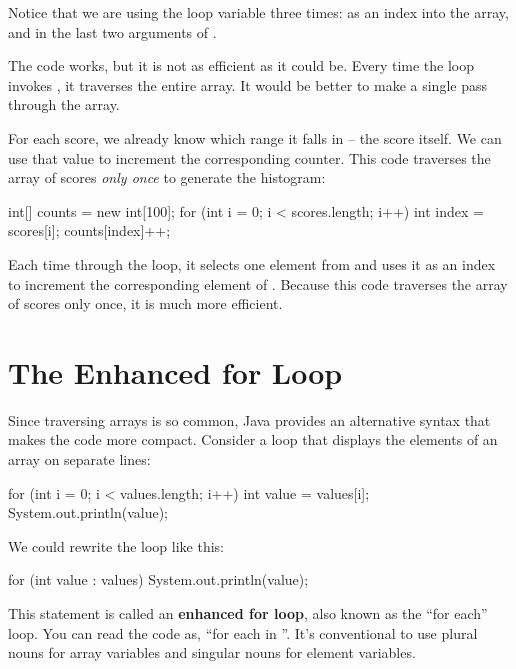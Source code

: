 Notice that we are using the loop variable  three times: as an index into the  array, and in the last two arguments of .


The code works, but it is not as efficient as it could be.
Every time the loop invokes , it traverses the entire array.
It would be better to make a single pass through the  array.

For each score, we already know which range it falls in -- the score itself.
We can use that value to increment the corresponding counter.
This code traverses the array of scores {\em only once} to generate the histogram:

\begin{code}
int[] counts = new int[100];
for (int i = 0; i < scores.length; i++) {
    int index = scores[i];
    counts[index]++;
}
\end{code}

Each time through the loop, it selects one element from  and uses it as an index to increment the corresponding element of .
Because this code traverses the array of scores only once, it is much more efficient.


\section{The Enhanced for Loop}
\label{enhanced}

Since traversing arrays is so common, Java provides an alternative syntax that makes the code more compact.
Consider a  loop that displays the elements of an array on separate lines:

\begin{code}
for (int i = 0; i < values.length; i++) {
    int value = values[i];
    System.out.println(value);
}
\end{code}

We could rewrite the loop like this:

\begin{code}
for (int value : values) {
    System.out.println(value);
}
\end{code}


This statement is called an {\bf enhanced for loop}, also known as the ``for each'' loop.
You can read the code as, ``for each  in ''.
It's conventional to use plural nouns for array variables and singular nouns for element variables.

